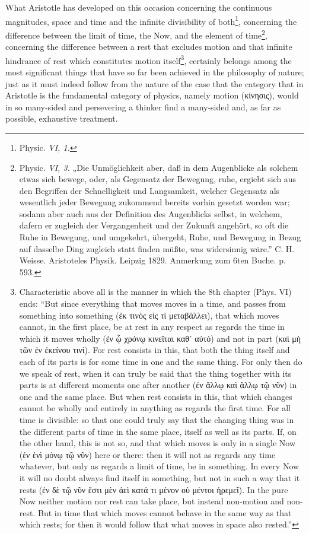 \documentclass[12pt,a4paper,openany]{book}
\newcommand{\opage}[1]{\marginnote{\footnotesize\textit{[#1]}}}
\begin{document}
What Aristotle has developed on this occasion concerning the continuous magnitudes, space and time and the infinite divisibility of both\footnote[2]{Physic. \textit{VI, 1.}}, concerning the difference between the limit of time, the Now, and the element of time\footnote[3]{Physic. \textit{VI, 3.} „Die Unmöglichkeit aber, daß in dem Augenblicke als solchem etwas sich bewege, oder, als Gegensatz der Bewegung, ruhe, ergiebt sich aus den Begriffen der Schnelligkeit und Langsamkeit, welcher Gegensatz als wesentlich jeder Bewegung zukommend bereits vorhin gesetzt worden war; sodann aber auch aus der Definition des Augenblicks selbst, in welchem, dafern er zugleich der Vergangenheit und der Zukunft angehört, so oft die Ruhe in Bewegung, und umgekehrt, übergeht, Ruhe, und Bewegung in Bezug auf dasselbe Ding zugleich statt finden müßte, was widersinnig wäre.'' C. H. Weisse. Aristoteles Physik. Leipzig 1829. Anmerkung zum 6ten Buche. p. 593.}, concerning
\setcounter{footnote}{0}%
\opage{138}the difference between a rest that excludes motion and that infinite hindrance of rest which constitutes motion itself\footnote[1]{Characteristic above all is the manner in which the 8th chapter (Phys. VI) ends: ``But since everything that moves moves in a time, and passes from something into something (ἐκ τινὸς εἰς τὶ μεταβάλλει), that which moves cannot, in the first place, be at rest in any respect as regards the time in which it moves wholly (ἐν ᾧ χρόνῳ κινεῖται καθ᾽ αὐτό) and not in part (καὶ μὴ τῶν ἐν ἐκείνου τινί). For rest consists in this, that both the thing itself and each of its parts is for some time in one and the same thing. For only then do we speak of rest, when it can truly be said that the thing together with its parts is at different moments one after another (ἐν ἄλλῳ καὶ ἄλλῳ τῷ νῦν) in one and the same place. But when rest consists in this, that which changes cannot be wholly and entirely in anything as regards the first time. For all time is divisible: so that one could truly say that the changing thing was in the different parts of time in the same place, itself as well as its parts. If, on the other hand, this is not so, and that which moves is only in a single Now (ἐν ἑνὶ μόνῳ τῷ νῦν) here or there: then it will not as regards any time whatever, but only as regards a limit of time, be in something. In every Now it will no doubt always find itself in something, but not in such a way that it rests (ἐν δὲ τῷ νῦν ἔστι μὲν ἀεὶ κατά τι μένον οὐ μέντοι ἠρεμεῖ). In the pure Now neither motion nor rest can take place, but instead non-motion and non-rest. But in time that which moves cannot behave in the same way as that which rests; for then it would follow that what moves in space also rested.''}, certainly belongs among the most significant things that have so far been achieved in the philosophy of nature; just as it must indeed follow from the nature of the case that the category that in Aristotle is the fundamental category of physics, namely motion (κίνησις), would in so many-sided and persevering a thinker find a many-sided and, as far as possible, exhaustive treatment.
\end{document}
